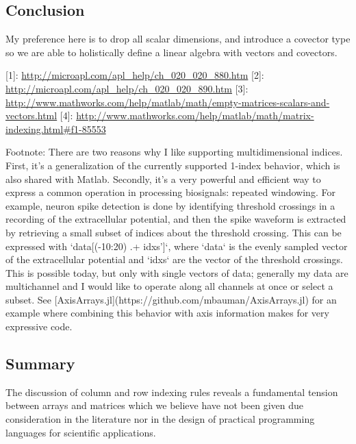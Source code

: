 \subsection{Conclusion}

My preference here is to drop all scalar dimensions, and introduce a covector
type so we are able to holistically define a linear algebra with vectors and
covectors.



[1]: \url{http://microapl.com/apl_help/ch_020_020_880.htm}
[2]: \url{http://microapl.com/apl_help/ch_020_020_890.htm}
[3]: \url{http://www.mathworks.com/help/matlab/math/empty-matrices-scalars-and-vectors.html}
[4]: \url{http://www.mathworks.com/help/matlab/math/matrix-indexing.html#f1-85553}

Footnote: There are two reasons why I like supporting multidimensional
indices. First, it's a generalization of the currently supported 1-index
behavior, which is also shared with Matlab. Secondly, it's a very powerful and
efficient way to express a common operation in processing biosignals: repeated
windowing. For example, neuron spike detection is done by identifying threshold
crossings in a recording of the extracellular potential, and then the spike
waveform is extracted by retrieving a small subset of indices about the
threshold crossing. This can be expressed with `data[(-10:20) .+ idxs']`, where
`data` is the evenly sampled vector of the extracellular potential and `idxs`
are the vector of the threshold crossings. This is possible today, but only
with single vectors of data; generally my data are multichannel and I would
like to operate along all channels at once or select a subset. See
[AxisArrays.jl](https://github.com/mbauman/AxisArrays.jl) for an example where
combining this behavior with axis information makes for very expressive code.



\subsection{Summary}

The discussion of column and row indexing rules reveals a fundamental tension
between arrays and matrices which we believe have not been given due
consideration in the literature nor in the design of practical programming
languages for scientific applications.

